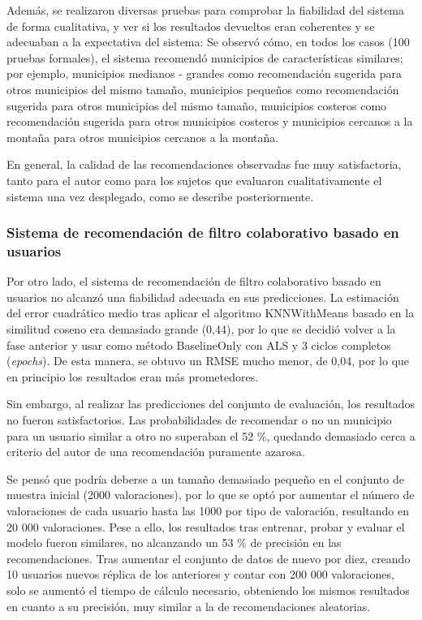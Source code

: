 Además, se realizaron diversas pruebas para comprobar la fiabilidad del sistema de forma cualitativa, y ver si los resultados devueltos eran coherentes y se adecuaban a la expectativa del sistema: Se observó cómo, en todos los casos (100 pruebas formales), el sistema recomendó municipios de características similares; por ejemplo, municipios medianos - grandes como recomendación sugerida para otros municipios del mismo tamaño, municipios pequeños como recomendación sugerida para otros municipios del mismo tamaño, municipios costeros como recomendación sugerida para otros municipios costeros y municipios cercanos a la montaña para otros municipios cercanos a la montaña.

En general, la calidad de las recomendaciones observadas fue muy satisfactoria, tanto para el autor como para los sujetos que evaluaron cualitativamente el sistema una vez desplegado, como se describe posteriormente.

\subsubsection{Sistema de recomendación de filtro colaborativo basado en usuarios}

Por otro lado, el sistema de recomendación de filtro colaborativo basado en usuarios no alcanzó una fiabilidad adecuada en sus predicciones. La estimación del error cuadrático medio tras aplicar el algoritmo KNNWithMeans basado en la similitud coseno era demasiado grande (0,44), por lo que se decidió volver a la fase anterior y usar como método BaselineOnly con ALS y 3 ciclos completos (\textit{epochs}). De esta manera, se obtuvo un RMSE mucho menor, de 0,04, por lo que en principio los resultados eran más prometedores.


Sin embargo, al realizar las predicciones del conjunto de evaluación, los resultados no fueron satisfactorios. Las probabilidades de recomendar o no un municipio para un usuario similar a otro no superaban el 52 \%, quedando demasiado cerca a criterio del autor de una recomendación puramente azarosa.

Se pensó que podría deberse a un tamaño demasiado pequeño en el conjunto de muestra inicial (2000 valoraciones), por lo que se optó por aumentar el número de valoraciones de cada usuario hasta las 1000 por tipo de valoración, resultando en 20 000 valoraciones. Pese a ello, los resultados tras entrenar, probar y evaluar el modelo fueron similares, no alcanzando un 53 \% de precisión en las recomendaciones. Tras aumentar el conjunto de datos de nuevo por diez, creando 10 usuarios nuevos réplica de los anteriores y contar con 200 000 valoraciones, solo se aumentó el tiempo de cálculo necesario, obteniendo los mismos resultados en cuanto a su precisión, muy similar a la de recomendaciones aleatorias.

